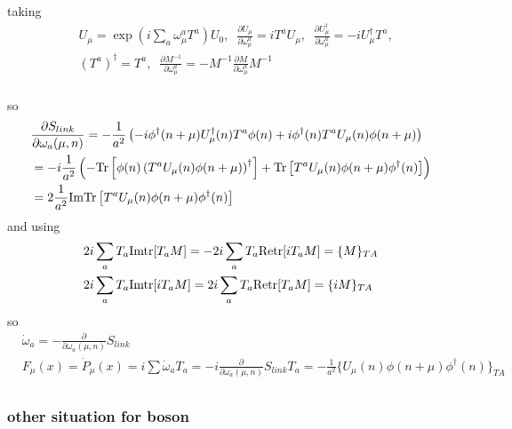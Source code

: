 taking
\begin{equation}
\begin{split}
&U_{\mu}=\exp (i\sum _a \omega _{\mu}^a T^a)U_0,\;\;\frac{\partial U_{\mu}}{\partial \omega_{\mu}^a}=iT^aU_{\mu},\;\;\frac{\partial U^{\dagger}_{\mu}}{\partial \omega_{\mu}^a}=-iU^{\dagger}_{\mu}T^a,\\
&\left(T^a\right)^{\dagger}=T^a,\;\;\frac{\partial M^{-1}}{\partial \omega _{\mu}^a}=-M^{-1}\frac{\partial M}{\partial \omega _{\mu}^a}M^{-1}\\
\end{split}
\end{equation}

so
\begin{equation}
\begin{split}
&\frac{\partial S_{link}}{\partial \omega _a(\mu,n)} = -\frac{1}{a^2} \left(-i\phi^{\dagger}(n+\mu) U_{\mu}^{\dagger}(n)T^a\phi(n)+ i\phi^{\dagger} (n)T^aU_{\mu}(n)\phi(n+\mu)\right) \\
&=-i\frac{1}{a^2}\left(-{\rm Tr}\left[\phi(n)\left(T^aU_{\mu}(n)\phi(n+\mu)\right)^{\dagger}\right]+ {\rm Tr}\left[T^aU_{\mu}(n)\phi(n+\mu)\phi^{\dagger} (n)\right]\right) \\
&=2\frac{1}{a^2}{\rm ImTr}\left[T^aU_{\mu}(n)\phi(n+\mu)\phi^{\dagger} (n)\right]\\
\end{split}
\end{equation}
and using
\begin{equation}
\begin{split}
&2i \sum _a T_a {\rm Im tr}[T_a M] = -2 i \sum _a T_a {\rm Re tr}[i T_a M] = \{M\}_{TA}\\
&2i \sum _a T_a {\rm Im tr}[i T_a M] = 2 i \sum _a T_a {\rm Re tr}[T_a M] = \{i M\}_{TA}\\
\end{split}
\end{equation}
so
\begin{equation}
\begin{split}
&\dot{\omega} _a=-\frac{\partial}{\partial \omega _a (\mu,n)}S_{link}\\
&F_{\mu}(x)=\dot{P}_{\mu}(x)=i\sum \dot{\omega}_a T_a=-i\frac{\partial}{\partial \omega _a (\mu,n)}S_{link} T_a=-\frac{1}{a^2}\{U_{\mu}(n)\phi(n+\mu)\phi^{\dagger} (n)\}_{TA}\\
\end{split}
\end{equation}

\subsubsection{\label{sec:bosonothersituation}other situation for boson}

